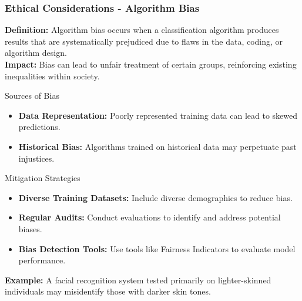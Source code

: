 \documentclass[aspectratio=169]{beamer}
\begin{document}
\begin{frame}[fragile]
    \frametitle{Ethical Considerations - Algorithm Bias}
    \textbf{Definition:} Algorithm bias occurs when a classification algorithm produces results that are systematically prejudiced due to flaws in the data, coding, or algorithm design. \\
    \textbf{Impact:} Bias can lead to unfair treatment of certain groups, reinforcing existing inequalities within society.

    \begin{block}{Sources of Bias}
        \begin{itemize}
            \item \textbf{Data Representation:} Poorly represented training data can lead to skewed predictions.
            \item \textbf{Historical Bias:} Algorithms trained on historical data may perpetuate past injustices.
        \end{itemize}
    \end{block}
    
    \begin{block}{Mitigation Strategies}
        \begin{itemize}
            \item \textbf{Diverse Training Datasets:} Include diverse demographics to reduce bias.
            \item \textbf{Regular Audits:} Conduct evaluations to identify and address potential biases.
            \item \textbf{Bias Detection Tools:} Use tools like Fairness Indicators to evaluate model performance.
        \end{itemize}
    \end{block}

    \textbf{Example:} A facial recognition system tested primarily on lighter-skinned individuals may misidentify those with darker skin tones.
\end{frame}
\end{document}
